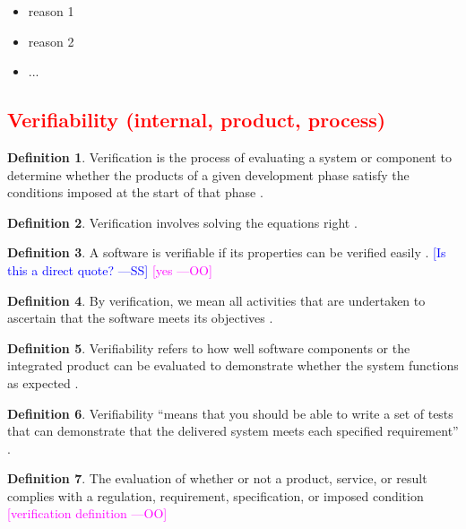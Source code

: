 \documentclass[letterpaper, cleveref]{lipics-v2019}
\newcommand{\authornote}[3]{\textcolor{#1}{[#3 ---#2]}}
\newcommand{\authornote}[3]{}
\newcommand{\wss}[1]{\authornote{blue}{SS}{#1}} %
\newcommand{\oo}[1]{\authornote{magenta}{OO}{#1}} %
\newcommand{\notdone}[1]{\textcolor{red}{#1}}
\theoremstyle{definition}
\newtheorem{defn}{Definition}
\begin{document}
\begin{itemize}
  \item reason 1
  \item reason 2
  \item ...
\end{itemize}


\subsection{\notdone{Verifiability (internal, product, process)}} %

\begin{defn}
	 Verification is the process of evaluating a system or component to
   determine whether the products of a given development phase satisfy the
   conditions imposed at the start of that phase
   \citep{IEEEStdGlossarySET1990}.
\end{defn}

\begin{defn}
	Verification involves solving the equations right \citep[p.~23]{Roache1998}.
\end{defn}

\begin{defn}
  A software is verifiable if its properties can be verified easily
  \citep{GhezziEtAl2003}.  \wss{Is this a direct quote?} \oo{yes}
\end{defn}

\begin{defn}
	By verification, we mean all activities that are undertaken to ascertain
  that the software meets its objectives \citep{GhezziEtAl2003}.
\end{defn}

\begin{defn}
	Verifiability refers to how well software components or the integrated
  product can be evaluated to demonstrate whether the system functions as
  expected \citep{wiegers2003softreq}.
\end{defn}

\begin{defn} \label{Defn_Verifiability1}
  Verifiability ``means that you should be able to write a set of tests that
  can demonstrate that the delivered system meets each specified
  requirement'' \citep{sommerville}. %
\end{defn}

\begin{defn}
	The evaluation of whether or not a product, service, or result complies
  with a regulation, requirement, specification, or imposed condition
  \citep{project2017guide} \oo {verification definition}
\end{defn}
\end{document}
